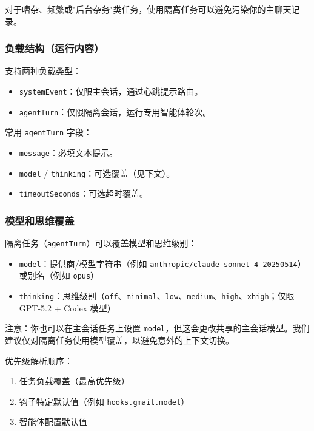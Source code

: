对于嘈杂、频繁或"后台杂务"类任务，使用隔离任务可以避免污染你的主聊天记录。

\subsubsection{负载结构（运行内容）}


支持两种负载类型：

\begin{itemize}
  \item \texttt{systemEvent}：仅限主会话，通过心跳提示路由。
  \item \texttt{agentTurn}：仅限隔离会话，运行专用智能体轮次。
\end{itemize}


常用 \texttt{agentTurn} 字段：

\begin{itemize}
  \item \texttt{message}：必填文本提示。
  \item \texttt{model} / \texttt{thinking}：可选覆盖（见下文）。
  \item \texttt{timeoutSeconds}：可选超时覆盖。
\end{itemize}


\subsubsection{模型和思维覆盖}


隔离任务（\texttt{agentTurn}）可以覆盖模型和思维级别：

\begin{itemize}
  \item \texttt{model}：提供商/模型字符串（例如 \texttt{anthropic/claude-sonnet-4-20250514}）或别名（例如 \texttt{opus}）
  \item \texttt{thinking}：思维级别（\texttt{off}、\texttt{minimal}、\texttt{low}、\texttt{medium}、\texttt{high}、\texttt{xhigh}；仅限 GPT-5.2 + Codex 模型）
\end{itemize}


注意：你也可以在主会话任务上设置 \texttt{model}，但这会更改共享的主会话模型。我们建议仅对隔离任务使用模型覆盖，以避免意外的上下文切换。

优先级解析顺序：

\begin{enumerate}
  \item 任务负载覆盖（最高优先级）
  \item 钩子特定默认值（例如 \texttt{hooks.gmail.model}）
  \item 智能体配置默认值
\end{enumerate}


